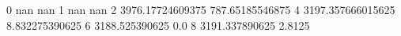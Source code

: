 0 nan nan
1 nan nan
2 3976.17724609375 787.65185546875
4 3197.357666015625 8.832275390625
6 3188.525390625 0.0
8 3191.337890625 2.8125
